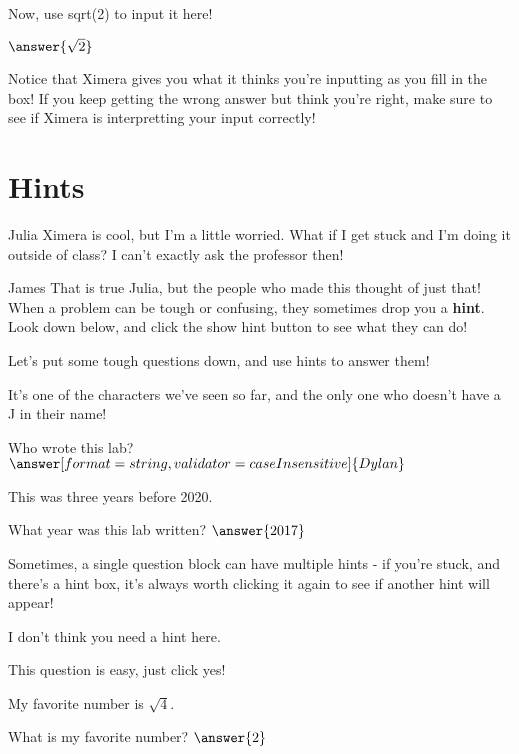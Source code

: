 \documentclass{ximera}
\begin{document}
\begin{question}
Now, use sqrt(2) to input it here!

$\answer{\sqrt{2}}$
\begin{feedback}[correct]
Notice that Ximera gives you what it thinks you're inputting as you fill in the box! If you keep getting the wrong answer but think you're right, make sure to see if Ximera is interpretting your input correctly!
\end{feedback}
\end{question}

\section{Hints}
\begin{dialogue}
\item[Julia] Ximera is cool, but I'm a little worried. What if I get stuck and I'm doing it outside of class? I can't exactly ask the professor then!
\item[James] That is true Julia, but the people who made this thought of just that! When a problem can be tough or confusing, they sometimes drop you a \textbf{hint}. Look down below, and click the show hint button to see what they can do!
\end{dialogue}

Let's put some tough questions down, and use hints to answer them!
\begin{question}
\begin{hint}
It's one of the characters we've seen so far, and the only one who doesn't have a J in their name!
\end{hint}
Who wrote this lab?
$\answer[format=string,validator=caseInsensitive]{Dylan}$
\end{question}
\begin{question}
\begin{hint}
This was three years before 2020.
\end{hint}
What year was this lab written?
$\answer{2017}$
\end{question}

Sometimes, a single question block can have multiple hints - if you're stuck, and there's a hint box, it's always worth clicking it again to see if another hint will appear!

\begin{question}
\begin{hint}
I don't think you need a hint here.
\end{hint}
This question is easy, just click yes!
\begin{multipleChoice}
\end{multipleChoice}

\begin{hint}
My favorite number is $\sqrt{4}$.
\end{hint}
What is my favorite number?
$\answer{2}$
\end{question}
\end{document}

